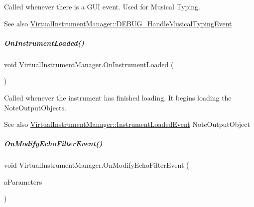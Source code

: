 Called whenever there is a G\+UI event. Used for Musical Typing. 

\begin{DoxySeeAlso}{See also}
\hyperlink{group___audio_testing_ga3a8d2d91b97d0541c8a509e5785e9bdf}{Virtual\+Instrument\+Manager\+::\+D\+E\+B\+U\+G\+\_\+\+Handle\+Musical\+Typing\+Event} 
\end{DoxySeeAlso}
\mbox{\label{group___virtual_instrument_manager_ac7d5b65484e450a400e32ab416ebc9f6}} 
\subparagraph{\texorpdfstring{On\+Instrument\+Loaded()}{OnInstrumentLoaded()}}
{\footnotesize\ttfamily void Virtual\+Instrument\+Manager.\+On\+Instrument\+Loaded (\begin{DoxyParamCaption}{ }\end{DoxyParamCaption})}



Called whenever the instrument has finished loading. It begins loading the Note\+Output\+Objects. 

\begin{DoxySeeAlso}{See also}
\hyperlink{group___virtual_instrument_manager_class_virtual_instrument_manager_1_1_instrument_loaded_event}{Virtual\+Instrument\+Manager\+::\+Instrument\+Loaded\+Event} Note\+Output\+Object 
\end{DoxySeeAlso}
\mbox{\label{group___virtual_instrument_manager_ae504c6ded8eb68ffb117c207fc25d99d}} 
\subparagraph{\texorpdfstring{On\+Modify\+Echo\+Filter\+Event()}{OnModifyEchoFilterEvent()}}
{\footnotesize\ttfamily void Virtual\+Instrument\+Manager.\+On\+Modify\+Echo\+Filter\+Event (\begin{DoxyParamCaption}\item[{\hyperlink{group___virtual_instrument_manager_struct_virtual_instrument_manager_1_1_echo_filter_parameters}{Echo\+Filter\+Parameters}}]{a\+Parameters }\end{DoxyParamCaption})}



